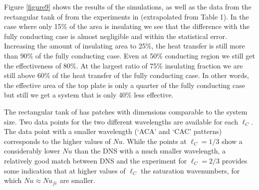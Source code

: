 \documentclass{jfm}
\begin{document}
{ Figure \ref{figure9} shows the results of the simulations, as well 
as the data from the rectangular tank of from the experiments in \cite{wang17}
(extrapolated from Table 1).}
In the case where
only 15\% of the area is insulating we see that the difference with the fully
conducting case is almost negligible and within the statistical error.
Increasing the amount of insulating area to 25\%, the heat transfer is still
more than 90\% of the fully conducting case.  Even at 50\% conducting region
we still get the effectiveness of 80\%.  At the largest ratio of 75\%
insulating fraction we are still above 60\% of the heat transfer of the fully
conducting case.  In other words, the effective area of the top plate is only
a quarter of the fully conducting case but still we get a system that is only
40\% less effective. 

{ The rectangular tank of \cite{wang17} has patches 
with dimensions comparable to the system size. Two data points for the
two different
wavelengths are available for each $\ell_C$. 
The data point with a smaller wavelength (`ACA' and `CAC' patterns)
corresponds to the higher values of $Nu$. While
the points at $\ell_C=1/3$ show a considerably lower $Nu$ 
than the DNS with a much smaller wavelength, 
a relatively good match between DNS and the experiment 
for $\ell_C=2/3$ provides some indication that at higher 
values of $\ell_C$ the saturation wavenumbers, for which $Nu \approx Nu_{fc}$ 
are smaller.}
\end{document}
